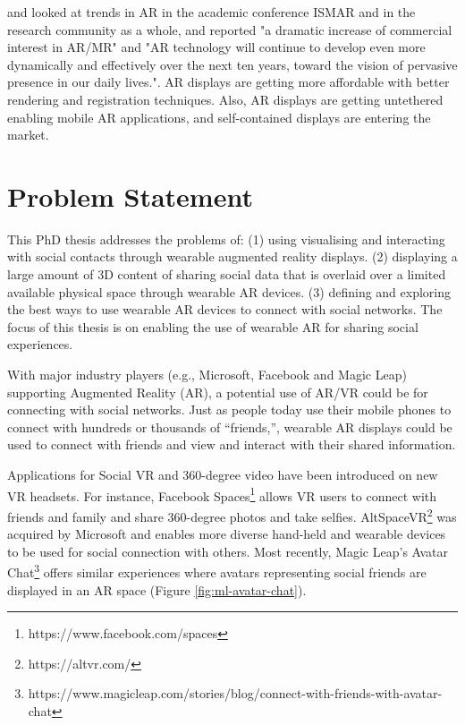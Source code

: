 \cite{Zhou2008} and \cite{Kim2018} looked at trends in AR in the academic conference ISMAR and in the research community as a whole, and reported "a dramatic increase of commercial interest in AR/MR" and "AR technology will continue to develop even more dynamically and effectively over the next ten years, toward the vision of pervasive presence in our daily lives.". AR displays are getting more affordable with better rendering and registration techniques. Also, AR displays are getting untethered enabling mobile AR applications, and self-contained displays are entering the market.

\section{Problem Statement}

This PhD thesis addresses the problems of: 
(1) using visualising and interacting with social contacts through wearable augmented reality displays. 
(2) displaying a large amount of 3D content of sharing social data that is overlaid over a limited available physical space through wearable AR devices. 
(3) defining and exploring the best ways to use wearable AR devices to connect with social networks.
The focus of this thesis is on enabling the use of wearable AR for sharing social experiences. 


With major industry players (e.g., Microsoft, Facebook and Magic Leap) supporting Augmented Reality (AR), a potential use of AR/VR could be for connecting with social networks. Just as people today use their mobile phones to connect with hundreds or thousands of ``friends,'', wearable AR displays could be used to connect with friends and view and interact with their shared information.

Applications for Social VR and 360-degree video have been introduced on new VR headsets. For instance, Facebook Spaces\footnote{https://www.facebook.com/spaces} allows VR users to connect with friends and family and share 360-degree photos and take selfies. AltSpaceVR\footnote{https://altvr.com/} was acquired by Microsoft and enables more diverse hand-held and wearable devices to be used for social connection with others. Most recently, Magic Leap's Avatar Chat\footnote{https://www.magicleap.com/stories/blog/connect-with-friends-with-avatar-chat} offers similar experiences where avatars representing social friends are displayed in an AR space (Figure \ref{fig:ml-avatar-chat}). 


